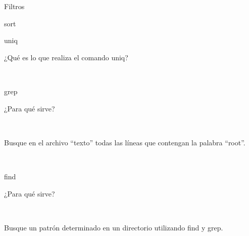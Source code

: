 \begin{section}{Filtros}
\begin{subsection}{sort}
\end{subsection}

\begin{subsection}{uniq}
\begin{quoting}
¿Qué es lo que realiza el comando uniq?
\end{quoting}\\

\end{subsection}

\begin{subsection}{grep}
\begin{quoting}
¿Para qué sirve?
\end{quoting}\\

\begin{quoting}
Busque en el archivo “texto” todas las líneas que contengan la palabra “root”.
\end{quoting}\\

\end{subsection}

\begin{subsection}{find}
\begin{quoting}
¿Para qué sirve?
\end{quoting}\\

\begin{quoting}
Busque un patrón determinado en un directorio utilizando find y grep.
\end{quoting}\\
\end{subsection}

\end{section}